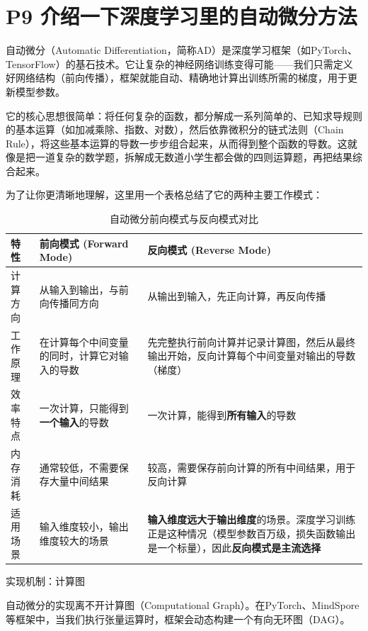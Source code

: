 \documentclass{article}
\begin{document}
\section{P9 介绍一下深度学习里的自动微分方法}
{\color{blue}

自动微分（Automatic Differentiation，简称AD）是深度学习框架（如PyTorch、TensorFlow）的基石技术。它让复杂的神经网络训练变得可能——我们只需定义好网络结构（前向传播），框架就能自动、精确地计算出训练所需的梯度，用于更新模型参数。

它的核心思想很简单：将任何复杂的函数，都分解成一系列简单的、已知求导规则的基本运算（如加减乘除、指数、对数），然后依靠微积分的链式法则（Chain Rule），将这些基本运算的导数一步步组合起来，从而得到整个函数的导数。这就像是把一道复杂的数学题，拆解成无数道小学生都会做的四则运算题，再把结果综合起来。

为了让你更清晰地理解，这里用一个表格总结了它的两种主要工作模式：

\begin{table}[htbp]
\centering\color{blue}
\caption{自动微分前向模式与反向模式对比}\vspace{0.3cm}
\renewcommand{\arraystretch}{1.5} %
\begin{tabular}{|p{2cm}|p{6cm}|p{6cm}|}\hline 
\textbf{特性} & \textbf{前向模式 (Forward Mode)} & \textbf{反向模式 (Reverse Mode)} \\ \hline 
计算方向 & 从输入到输出，与前向传播同方向 & 从输出到输入，先正向计算，再反向传播 \\ \hline 
工作原理 & 在计算每个中间变量的同时，计算它对输入的导数 & 先完整执行前向计算并记录计算图，然后从最终输出开始，反向计算每个中间变量对输出的导数（梯度） \\ \hline 
效率特点 & 一次计算，只能得到\textbf{一个输入}的导数 & 一次计算，能得到\textbf{所有输入}的导数 \\ \hline 
内存消耗 & 通常较低，不需要保存大量中间结果 & 较高，需要保存前向计算的所有中间结果，用于反向计算 \\ \hline 
适用场景 & 输入维度较小，输出维度较大的场景 & \textbf{输入维度远大于输出维度}的场景。深度学习训练正是这种情况（模型参数百万级，损失函数输出是一个标量），因此\textbf{反向模式是主流选择} \\ \hline 
\end{tabular}
\label{tab:ad_modes}
\end{table}

实现机制：计算图

自动微分的实现离不开计算图（Computational Graph）。在PyTorch、MindSpore等框架中，当我们执行张量运算时，框架会动态构建一个有向无环图（DAG）。

}
\end{document}
